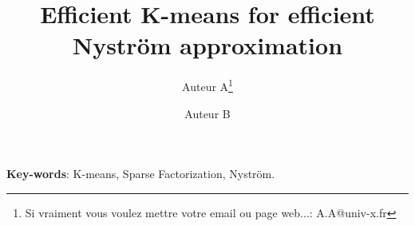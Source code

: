 \documentclass[twocolumn]{article}
\title{Efficient K-means for efficient Nyström approximation}
\author[1]{Auteur A\thanks{Si vraiment vous voulez mettre votre email
    ou page web...: A.A@univ-x.fr}}
\author[2]{Auteur B}
\affil[1]{Université X, CNRS}
\affil[2]{Université Y, CNRS et INRIA}
\begin{document}
\maketitle



\medskip

\noindent\textbf{Key-words}: K-means, Sparse Factorization, Nyström.










\end{document}
